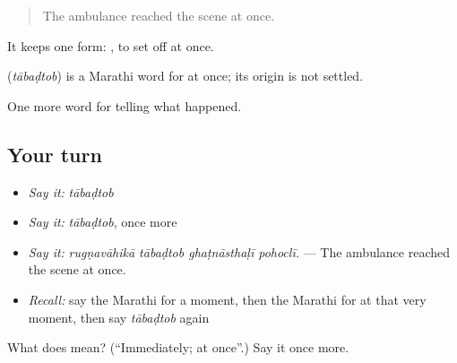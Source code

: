 \begin{quote}
The ambulance reached the scene at once.
\end{quote}

It keeps one form:  , to set off at once.

\begin{cousinweb}
\textbf{} (\emph{tābaḍtob}) is a Marathi word for at once; its origin is not settled.
\end{cousinweb}

\begin{grammarlens}[title={What you've built}]
One more word for telling what happened.
\end{grammarlens}

\subsection*{Your turn}
\begin{itemize}
\raggedright
  \item \emph{Say it:} \emph{tābaḍtob}
  \item \emph{Say it:} \emph{tābaḍtob}, once more
  \item \emph{Say it:} \emph{rugṇavāhikā tābaḍtob ghaṭnāsthaḷī pohoclī.} — The ambulance reached the scene at once.
  \item \emph{Recall:} say the Marathi for a moment, then the Marathi for at that very moment, then say \emph{tābaḍtob} again
\end{itemize}

\begin{tcolorbox}[breakable,colback=teal!4,colframe=teal!35!black,title={Before you move on}]
What does  mean? (\textquotedblleft{}Immediately; at once\textquotedblright{}.) Say it once more.
\end{tcolorbox}
